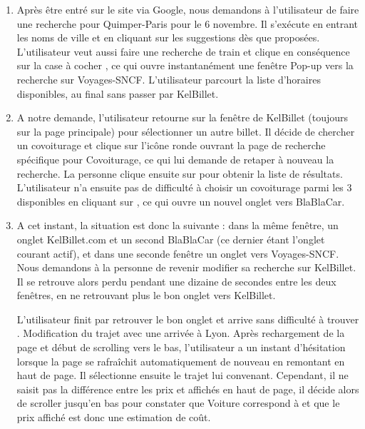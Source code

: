 \begin{enumerate}
\item Apr\`{e}s \^{e}tre entr\'{e} sur le site via Google, nous demandons \`{a} l'utilisateur de faire une recherche pour Quimper-Paris pour le 6 novembre. Il s'ex\'{e}cute en entrant les noms de ville et en cliquant sur les suggestions d\`{e}s que propos\'{e}es. L'utilisateur veut aussi faire une recherche de train et clique en cons\'{e}quence sur la case \`{a} cocher , ce qui ouvre instantan\'{e}ment une fen\^{e}tre Pop-up vers la recherche sur Voyages-SNCF. L'utilisateur parcourt la liste d'horaires disponibles, au final sans passer par KelBillet.


\item A notre demande, l'utilisateur retourne sur la fen\^{e}tre de KelBillet (toujours sur la page principale) pour s\'{e}lectionner un autre billet. Il d\'{e}cide de chercher un covoiturage et clique sur l'ic\^{o}ne ronde  ouvrant la page de recherche sp\'{e}cifique pour Covoiturage, ce qui lui demande de retaper \`{a} nouveau la recherche. La personne clique ensuite sur  pour obtenir la liste de r\'{e}sultats. L'utilisateur n'a ensuite pas de difficult\'{e} \`{a} choisir un covoiturage parmi les 3 disponibles en cliquant sur , ce qui ouvre un nouvel onglet vers BlaBlaCar.


\item A cet instant, la situation est donc la suivante : dans la m\^{e}me fen\^{e}tre, un onglet KelBillet.com et un second  BlaBlaCar (ce dernier \'{e}tant l'onglet courant actif), et dans une seconde fen\^{e}tre un onglet vers Voyages-SNCF. Nous demandons \`{a} la personne de revenir modifier sa recherche sur KelBillet. Il se retrouve alors perdu pendant une dizaine de secondes entre les deux fen\^{e}tres, en ne retrouvant plus le bon onglet vers KelBillet. 

L'utilisateur finit par retrouver le bon onglet et arrive sans difficult\'{e} \`{a} trouver . Modification du trajet avec une arriv\'{e}e \`{a} Lyon. Apr\`{e}s rechargement de la page et d\'{e}but de scrolling vers le bas, l'utilisateur a un instant d'h\'{e}sitation lorsque la page se rafra\^{i}chit automatiquement de nouveau en remontant en haut de page. Il s\'{e}lectionne ensuite le trajet lui convenant. Cependant, il ne saisit pas la diff\'{e}rence entre les prix  et  affich\'{e}s en haut de page, il d\'{e}cide alors de scroller jusqu'en bas pour constater que Voiture correspond \`{a}  et que le prix affich\'{e} est donc une estimation de co\^{u}t.



\end{enumerate}
